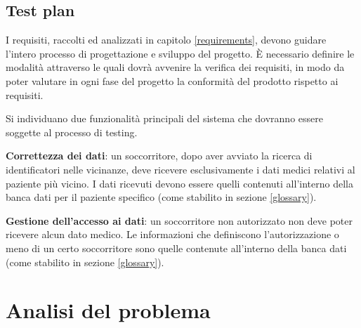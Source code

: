 \documentclass[a4paper,12pt]{report}
\begin{document}
\section{Test plan}
I requisiti, raccolti ed analizzati in capitolo \ref{requirements}, devono guidare l'intero processo di progettazione e sviluppo del progetto. È necessario definire le modalità attraverso le quali dovrà avvenire la verifica dei requisiti, in modo da poter valutare in ogni fase del progetto la conformità del prodotto rispetto ai requisiti.

Si individuano due funzionalità principali del sistema che dovranno essere soggette al processo di testing.
\begin{description}
	\item \textbf{Correttezza dei dati}: un soccorritore, dopo aver avviato la ricerca di identificatori nelle vicinanze, deve ricevere esclusivamente i dati medici relativi al paziente più vicino. I dati ricevuti devono essere quelli contenuti all'interno della banca dati per il paziente specifico (come stabilito in sezione \ref{glossary}).
	\item \textbf{Gestione dell'accesso ai dati}: un soccorritore non autorizzato non deve poter ricevere alcun dato medico. Le informazioni che definiscono l'autorizzazione o meno di un certo soccorritore sono quelle contenute all'interno della banca dati (come stabilito in sezione \ref{glossary}). 
\end{description}

\chapter{Analisi del problema}
\end{document}
